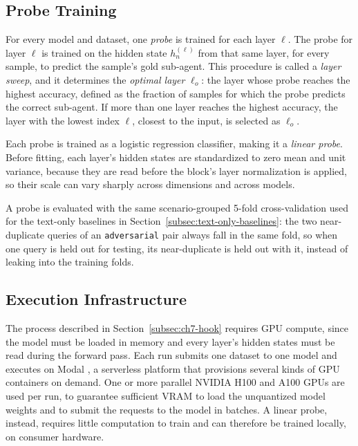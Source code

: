 \subsection{Probe Training}
\label{subsec:ch7-probe}

For every model and dataset, one \emph{probe} is trained for each layer $\ell$. The probe for layer $\ell$ is trained on the hidden state $h^{(\ell)}_n$ from that same layer, for every sample, to predict the sample's gold sub-agent. This procedure is called a \emph{layer sweep}, and it determines the \emph{optimal layer} $\ell_o$: the layer whose probe reaches the highest accuracy, defined as the fraction of samples for which the probe predicts the correct sub-agent. If more than one layer reaches the highest accuracy, the layer with the lowest index $\ell$, closest to the input, is selected as $\ell_o$.

Each probe is trained as a logistic regression classifier, making it a \emph{linear probe}. Before fitting, each layer's hidden states are standardized to zero mean and unit variance, because they are read before the block's layer normalization is applied, so their scale can vary sharply across dimensions and across models.

A probe is evaluated with the same scenario-grouped 5-fold cross-validation used for the text-only baselines in Section~\ref{subsec:text-only-baselines}: the two near-duplicate queries of an \texttt{adversarial} pair always fall in the same fold, so when one query is held out for testing, its near-duplicate is held out with it, instead of leaking into the training folds.

\subsection{Execution Infrastructure}
\label{subsec:ch7-infra}

The process described in Section~\ref{subsec:ch7-hook} requires GPU compute, since the model must be loaded in memory and every layer's hidden states must be read during the forward pass. Each run submits one dataset to one model and executes on Modal \cite{ModalDocumentation}, a serverless platform that provisions several kinds of GPU containers on demand. One or more parallel NVIDIA H100 and A100 GPUs are used per run, to guarantee sufficient VRAM to load the unquantized model weights and to submit the requests to the model in batches. A linear probe, instead, requires little computation to train and can therefore be trained locally, on consumer hardware.

